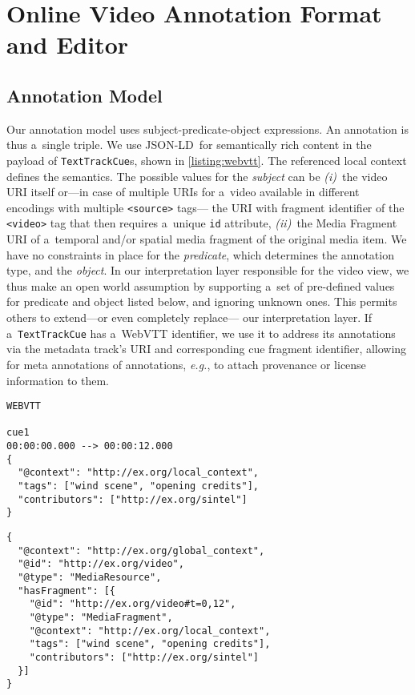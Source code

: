 \documentclass{sig-alternate}
\def\JSONLD{\mbox{JSON-LD}}
\begin{document}
\section{Online Video Annotation Format and Editor}
\label{sec:online-video-annotation-format-and-editor}

\subsection{Annotation Model}

Our annotation model uses subject-predicate-object expressions.
An annotation is thus a~single triple.
We use \JSONLD\ for semantically rich content
in the payload of \texttt{TextTrackCue}s, shown in
\autoref{listing:webvtt}.
The referenced local context defines the semantics.
The possible values for the \emph{subject} can be \emph{(i)}~the video
URI itself or---in case of multiple URIs for a~video available
in different encodings with multiple \texttt{<source>} tags---%
the URI with fragment identifier of the \texttt{<video>} tag
that then requires a~unique \texttt{id} attribute,
\emph{(ii)}~the Media Fragment URI of a~temporal and/or spatial
media fragment of the original media item.
We have no constraints in place for the \emph{predicate},
which determines the annotation type, and the \emph{object}.
In our interpretation layer responsible for the video view,
we thus make an open world assumption
by supporting a~set of pre-defined values for predicate and object
listed below, and ignoring unknown ones.
This permits others to extend---or even completely replace---%
our interpretation layer.
If a~\texttt{TextTrackCue} has a~WebVTT identifier,
we use it to address its annotations
via the metadata track's URI
and corresponding cue fragment identifier,
allowing for meta annotations of annotations, \emph{e.g.},
to attach provenance or license information to them.

\begin{lstlisting}[caption={Sample WebVTT metadata file},
  label=listing:webvtt, float=t!]
WEBVTT

cue1
00:00:00.000 --> 00:00:12.000
{
  "@context": "http://ex.org/local_context",
  "tags": ["wind scene", "opening credits"],
  "contributors": ["http://ex.org/sintel"]
}
\end{lstlisting}

\begin{lstlisting}[caption={Generated \JSONLD\ for the Web of Data, see
    \autoref{listing:rdftriples} for the RDF triples},
  label=listing:jsonld, float=t!]
{
  "@context": "http://ex.org/global_context",
  "@id": "http://ex.org/video",
  "@type": "MediaResource",
  "hasFragment": [{
    "@id": "http://ex.org/video#t=0,12",
    "@type": "MediaFragment",
    "@context": "http://ex.org/local_context",
    "tags": ["wind scene", "opening credits"],
    "contributors": ["http://ex.org/sintel"]
  }]
}
\end{lstlisting}
\end{document}
